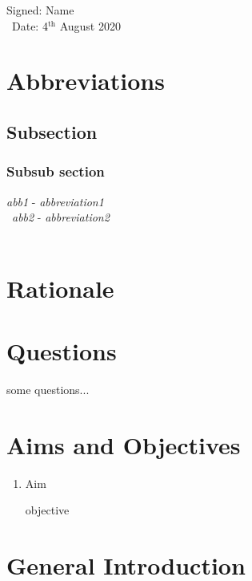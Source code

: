 \vspace{2mm} %
\noindent
Signed: Name  \\\  Date:  4$^{\mathrm{th}}$ August 2020

 
\newpage
 
  
\section{Abbreviations}
\label{sec:Abbs}

\subsection{Subsection} 
\subsubsection{Subsub section}
\textit{abb1} - \textit{abbreviation1} \\\
\textit{abb2} - \textit{abbreviation2} \\\


%


 
\section{Rationale}
\label{sec:Rat}

\newpage
 

\section{Questions}
\label{sec:Quest}

\noindent some questions...


\newpage


\section{Aims and Objectives}
\label{sec:Aim}

 \begin{enumerate}

\item Aim

\noindent objective


\end{enumerate}

\newpage

\section{General Introduction}
\label{sec:Gen}

